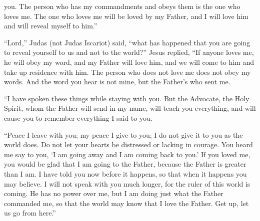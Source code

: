 {you.
The person who has
my
commandments
and
obeys
them
is
the one who loves
me.
The one who loves
me
will be loved
by
my
Father,
and I
will love
him
and
will reveal
myself
to him.”
\par }{\PP {}“Lord,”
Judas
(not
Judas Iscariot) said, “what
has happened
that
you are going
to reveal
yourself
to us
and
not
to the world?”
Jesus
replied, “If
anyone
loves
me,
he will obey
my
word,
and
my
Father
will love
him,
and
we will come
to
him
and
take up
residence
with
him.
The person who does
not
love
me
does
not
obey
my
words.
And
the word
you hear
is
not
mine,
but
the Father’s
who sent
me.
\par }{\PP {}“I have spoken
these things
while staying
with
you.
But
the Advocate,
the Holy
Spirit,
whom
the Father
will send
in
my
name,
will teach
you
everything,
and
will cause
you
to remember everything
I
said
to you.
\par }{\PP {}“Peace
I leave
with you;
my
peace
I
give
to you;
I do
not
give
it to you
as
the world
does.
Do
not
let
your
hearts
be distressed
or
lacking in courage.
You heard
me
say
to you, ‘I am going away
and
I am coming
back
to you.’
If
you loved
me,
you would be glad
that
I am going
to
the Father,
because
the Father
is
greater than
I am.
I have told
you
now
before
it happens,
so that
when
it happens
you may believe.
I will
not
speak
with
you
much
longer,
for
the ruler
of this world
is coming.
He has
no
power over
me,
but
I am doing
just
what the Father
commanded
me,
so that
the world
may know
that
I love
the Father.
Get up,
let us go
from here.”

}
